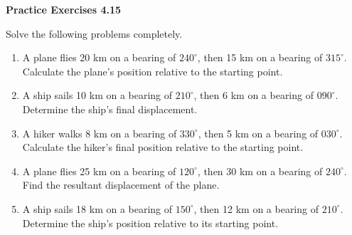 \vspace{0.3ex}
\noindent\textbf{Practice Exercises 4.15}

\vspace{0.2ex}

Solve the following problems completely.

\begin{enumerate}





    \item A plane flies 20 km on a bearing of \(240^\circ\), then 15 km on a bearing of \(315^\circ\). Calculate the plane’s position relative to the starting point.

    \item A ship sails 10 km on a bearing of \(210^\circ\), then 6 km on a bearing of \(090^\circ\). Determine the ship’s final displacement.

    \item A hiker walks 8 km on a bearing of \(330^\circ\), then 5 km on a bearing of \(030^\circ\). Calculate the hiker’s final position relative to the starting point.

    \item A plane flies 25 km on a bearing of \(120^\circ\), then 30 km on a bearing of \(240^\circ\). Find the resultant displacement of the plane.

    \item A ship sails 18 km on a bearing of \(150^\circ\), then 12 km on a bearing of \(210^\circ\). Determine the ship’s position relative to its starting point.
\end{enumerate}
